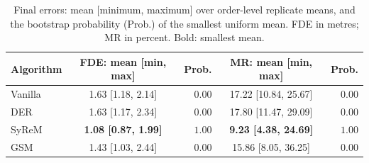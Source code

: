 \begin{table}[!t]
\centering
\caption{Final errors: mean [minimum, maximum] over order-level replicate means, and the bootstrap probability (Prob.) of the smallest uniform mean. FDE in metres; MR in percent. Bold: smallest mean.}
\label{tab:final_error}
\setlength{\tabcolsep}{3pt}
\footnotesize
\begin{tabular*}{\columnwidth}{@{\extracolsep{\fill}}lcrcr@{}}
\toprule
Algorithm & FDE: mean [min, max] & Prob. & MR: mean [min, max] & Prob. \\
\midrule
Vanilla & 1.63 [1.18, 2.14] & $0.00$ & 17.22 [10.84, 25.67] & $0.00$ \\
DER & 1.63 [1.17, 2.34] & $0.00$ & 17.80 [11.47, 29.09] & $0.00$ \\
SyReM & \textbf{1.08 [0.87, 1.99]} & $1.00$ & \textbf{9.23 [4.38, 24.69]} & $1.00$ \\
GSM & 1.43 [1.03, 2.44] & $0.00$ & 15.86 [8.05, 36.25] & $0.00$ \\
\bottomrule
\end{tabular*}
\end{table}
